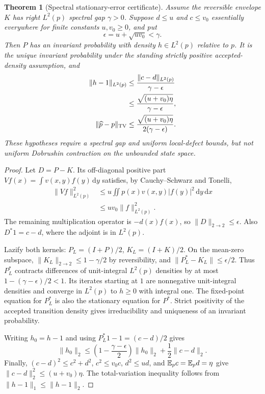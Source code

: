 \documentclass[pdflatex,iicol,sn-mathphys-ay]{sn-jnl}
\newtheorem{theorem}{Theorem}[section]
\theoremstyle{definition}\newtheorem{definition}[theorem]{Definition}
\theoremstyle{remark}\newtheorem{remark}[theorem]{Remark}
\numberwithin{equation}{section}
\newcommand{\dd}{\,\mathrm d}\newcommand{\cA}{c_\alpha}\newcommand{\sg}{\operatorname{sigmoid}}
\newcommand{\1}{\mathbf 1}
\begin{document}
\begin{theorem}[Spectral stationary-error certificate]\label{thm:spectralcalibration}
Assume the reversible envelope $K$ has right $L^2(p)$ spectral gap $\gamma>0$. Suppose $d\le u$ and $c\le v_0$ essentially everywhere for finite constants $u,v_0\ge0$, and put
\[
 \epsilon=u+\sqrt{uv_0}<\gamma.
\]
Then $P$ has an invariant probability with density $h\in L^2(p)$ relative to $p$. It is the unique invariant probability under the standing strictly positive accepted-density assumption, and
\begin{equation}
\begin{aligned}
 \|h-1\|_{L^2(p)}
 &\le\frac{\|c-d\|_{L^2(p)}}{\gamma-\epsilon}\\
 &\le\frac{\sqrt{(u+v_0)\eta}}{\gamma-\epsilon},\\
 \|\widehat p-p\|_{\mathrm{TV}}&\le\frac{\sqrt{(u+v_0)\eta}}{2(\gamma-\epsilon)}.
\end{aligned}\label{eq:spectralcertificate}
\end{equation}
These hypotheses require a spectral gap and uniform local-defect bounds, but not uniform Dobrushin contraction on the unbounded state space.
\end{theorem}
\begin{proof}
Let $D=P-K$. Its off-diagonal positive part $Vf(x)=\int v(x,y)f(y)\dd y$ satisfies, by Cauchy--Schwarz and Tonelli,
\[
\begin{aligned}
 \|Vf\|_{L^2(p)}^2
 &\le u\iint p(x)v(x,y)|f(y)|^2\dd y\dd x\\
 &\le uv_0\|f\|_{L^2(p)}^2.
\end{aligned}
\]
The remaining multiplication operator is $-d(x)f(x)$, so $\|D\|_{2\to2}\le\epsilon$. Also $D^*1=c-d$, where the adjoint is in $L^2(p)$.

Lazify both kernels: $P_L=(I+P)/2$, $K_L=(I+K)/2$. On the mean-zero subspace, $\|K_L\|_{2\to2}\le1-\gamma/2$ by reversibility, and $\|P_L^*-K_L\|\le\epsilon/2$. Thus $P_L^*$ contracts differences of unit-integral $L^2(p)$ densities by at most $1-(\gamma-\epsilon)/2<1$. Its iterates starting at $1$ are nonnegative unit-integral densities and converge in $L^2(p)$ to $h\ge0$ with integral one. The fixed-point equation for $P_L^*$ is also the stationary equation for $P^*$. Strict positivity of the accepted transition density gives irreducibility and uniqueness of an invariant probability.

Writing $h_0=h-1$ and using $P_L^*1-1=(c-d)/2$ gives
\[
 \|h_0\|_2\le\left(1-\frac{\gamma-\epsilon}{2}\right)\|h_0\|_2+\frac12\|c-d\|_2.
\]
Finally, $(c-d)^2\le c^2+d^2$, $c^2\le v_0c$, $d^2\le ud$, and $\mathbb E_pc=\mathbb E_pd=\eta$ give $\|c-d\|_2^2\le(u+v_0)\eta$. The total-variation inequality follows from $\|h-1\|_1\le\|h-1\|_2$.
\end{proof}
\end{document}
